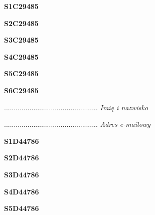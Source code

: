 \begin{turn}{90}\huge \textbf{S1C29485}\end{turn}

\begin{turn}{90}\huge \textbf{S2C29485}\end{turn}

\begin{turn}{90}\huge \textbf{S3C29485}\end{turn}

\begin{turn}{90}\huge \textbf{S4C29485}\end{turn}

\begin{turn}{90}\huge \textbf{S5C29485}\end{turn}

\begin{turn}{90}\huge \textbf{S6C29485}\end{turn}

\begin{turn}{90}\begin{minipage}{\linewidth} \vspace{20mm} ................................................  \textit{Imię i nazwisko}\end{minipage}\end{turn}

\begin{turn}{90}\begin{minipage}{\linewidth} \vspace{20mm} ................................................  \textit{Adres e-mailowy}\end{minipage}\end{turn}

\begin{turn}{90}\huge \textbf{S1D44786}\end{turn}

\begin{turn}{90}\huge \textbf{S2D44786}\end{turn}

\begin{turn}{90}\huge \textbf{S3D44786}\end{turn}

\begin{turn}{90}\huge \textbf{S4D44786}\end{turn}

\begin{turn}{90}\huge \textbf{S5D44786}\end{turn}

